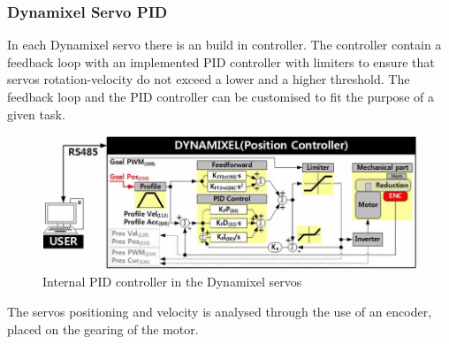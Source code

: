 

\subsubsection{Dynamixel Servo PID}
In each Dynamixel servo there is an build in controller. The controller contain a feedback loop with an implemented PID controller with limiters to ensure that servos rotation-velocity do not exceed a lower and a higher threshold\cite{PIDmxx}. The feedback loop and the PID controller can be customised to fit the purpose of a given task.
\begin{figure}[H]
    \centering
    \includegraphics[width=\textwidth]{Figures/Technical_figures/PIDMX.PNG}
    \caption{Internal PID controller in the Dynamixel servos\cite{PIDmxx}}
    \label{fig:PIDMX}
\end{figure}

The servos positioning and velocity is analysed through the use of an encoder, placed on the gearing of the motor.  